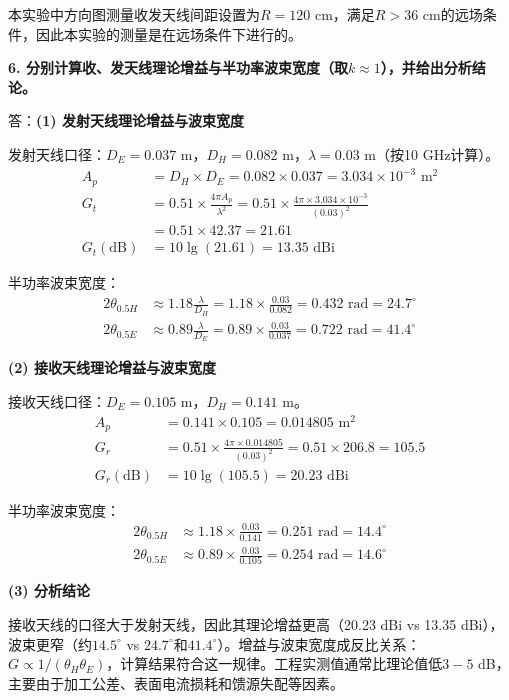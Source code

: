 \documentclass[12pt,a4paper]{article}
\begin{document}
本实验中方向图测量收发天线间距设置为$R = 120$ cm，满足$R > 36$ cm的远场条件，因此本实验的测量是在远场条件下进行的。


\textbf{6. 分别计算收、发天线理论增益与半功率波束宽度（取$k \approx 1$），并给出分析结论。}

答：\textbf{(1) 发射天线理论增益与波束宽度}

发射天线口径：$D_E = 0.037$ m，$D_H = 0.082$ m，$\lambda = 0.03$ m（按10 GHz计算）。
\begin{align*}
A_p &= D_H \times D_E = 0.082 \times 0.037 = 3.034 \times 10^{-3}\text{ m}^2 \\
G_t &= 0.51 \times \frac{4\pi A_p}{\lambda^2} = 0.51 \times \frac{4\pi \times 3.034 \times 10^{-3}}{(0.03)^2} \\
    &= 0.51 \times 42.37 = 21.61 \\
G_t(\text{dB}) &= 10\lg(21.61) = 13.35\text{ dBi}
\end{align*}

半功率波束宽度：
\begin{align*}
2\theta_{0.5H} &\approx 1.18\frac{\lambda}{D_H} = 1.18 \times \frac{0.03}{0.082} = 0.432\text{ rad} = 24.7^\circ \\
2\theta_{0.5E} &\approx 0.89\frac{\lambda}{D_E} = 0.89 \times \frac{0.03}{0.037} = 0.722\text{ rad} = 41.4^\circ
\end{align*}

\textbf{(2) 接收天线理论增益与波束宽度}

接收天线口径：$D_E = 0.105$ m，$D_H = 0.141$ m。
\begin{align*}
A_p &= 0.141 \times 0.105 = 0.014805\text{ m}^2 \\
G_r &= 0.51 \times \frac{4\pi \times 0.014805}{(0.03)^2} = 0.51 \times 206.8 = 105.5 \\
G_r(\text{dB}) &= 10\lg(105.5) = 20.23\text{ dBi}
\end{align*}

半功率波束宽度：
\begin{align*}
2\theta_{0.5H} &\approx 1.18 \times \frac{0.03}{0.141} = 0.251\text{ rad} = 14.4^\circ \\
2\theta_{0.5E} &\approx 0.89 \times \frac{0.03}{0.105} = 0.254\text{ rad} = 14.6^\circ
\end{align*}

\textbf{(3) 分析结论}

接收天线的口径大于发射天线，因此其理论增益更高（20.23 dBi vs 13.35 dBi），波束更窄（约$14.5^\circ$ vs $24.7^\circ$和$41.4^\circ$）。增益与波束宽度成反比关系：$G \propto 1/(\theta_H\theta_E)$，计算结果符合这一规律。工程实测值通常比理论值低$3-5$ dB，主要由于加工公差、表面电流损耗和馈源失配等因素。
\end{document}
